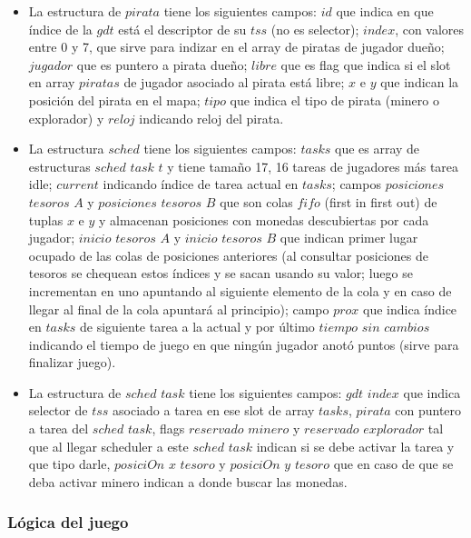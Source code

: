 \begin{itemize}
\item La estructura de $pirata$ tiene los siguientes campos: $id$ que indica en que índice de la $gdt$ está el
descriptor de su $tss$ (no es selector); $index$, con valores entre 0 y 7, que sirve para indizar en el array de 
piratas de jugador dueño; $jugador$ que es puntero a pirata dueño; $libre$ que es flag que indica si
el slot en array $piratas$ de jugador asociado al pirata está libre; $x$ e $y$ que indican la posición del
pirata en el mapa; $tipo$ que indica el tipo de pirata (minero o explorador) y $reloj$ indicando reloj del pirata.
\\
\item La estructura $sched$ tiene los siguientes campos: $tasks$ que es array de estructuras $sched$ $task$ $t$ y tiene
tamaño 17, 16 tareas de jugadores más tarea idle; $current$ indicando índice de tarea actual en $tasks$; 
campos $posiciones$ $tesoros$ $A$ y $posiciones$ $tesoros$ $B$ que son colas $fifo$ (first in first out) de 
tuplas $x$ e $y$ y almacenan posiciones con monedas descubiertas por cada jugador; $inicio$ $tesoros$ $A$ y
$inicio$ $tesoros$ $B$ que indican primer lugar ocupado de las colas de posiciones anteriores (al consultar
posiciones de tesoros se chequean estos índices y se sacan usando su valor; luego se incrementan en uno apuntando
al siguiente elemento de la cola y en caso de llegar al final de la cola apuntará al principio); campo $prox$
que indica índice en $tasks$ de siguiente tarea a la actual y por último $tiempo$ $sin$ $cambios$ indicando 
el tiempo de juego en que ningún jugador anotó puntos (sirve para finalizar juego).
\\
\item La estructura de $sched$ $task$ tiene los siguientes campos: $gdt$ $index$ que indica selector de $tss$ asociado
a tarea en ese slot de array $tasks$, $pirata$ con puntero a tarea del $sched$ $task$, flags
$reservado$ $minero$ y $reservado$ $explorador$ tal que al llegar scheduler a este $sched$ $task$ indican si 
se debe activar la tarea y que tipo darle, $posiciOn$ $x$ $tesoro$ y $posiciOn$ $y$ $tesoro$ que en caso de 
que se deba activar minero indican a donde buscar las monedas.
\end{itemize}

\subsubsection{Lógica del juego}
 
